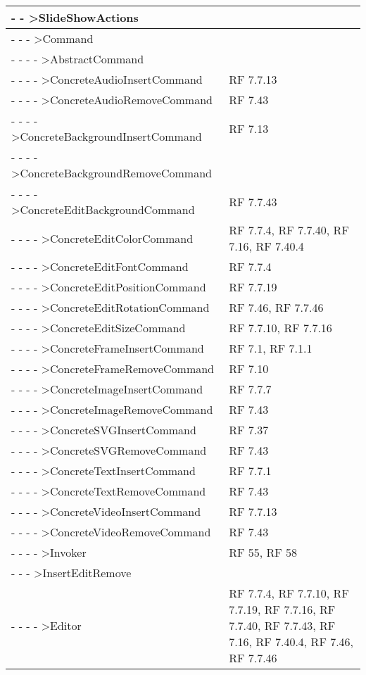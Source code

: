 {\begin{longtable} [c]{| p{8cm} | p{6cm} |}
 \hline 
- - >SlideShowActions & \\ 
 \hline 
- - - >Command & \\ 
 \hline 
- - - - >AbstractCommand & \\ 
 \hline 
- - - - >ConcreteAudioInsertCommand & RF 7.7.13\\ 
 \hline 
- - - - >ConcreteAudioRemoveCommand & RF 7.43\\ 
 \hline 
- - - - >ConcreteBackgroundInsertCommand & RF 7.13\\ 
 \hline 
- - - - >ConcreteBackgroundRemoveCommand & \\ 
 \hline 
- - - - >ConcreteEditBackgroundCommand & RF 7.7.43\\ 
 \hline 
- - - - >ConcreteEditColorCommand & RF 7.7.4, RF 7.7.40, RF 7.16, RF 7.40.4\\ 
 \hline 
- - - - >ConcreteEditFontCommand & RF 7.7.4\\ 
 \hline 
- - - - >ConcreteEditPositionCommand & RF 7.7.19\\ 
 \hline 
- - - - >ConcreteEditRotationCommand & RF 7.46, RF 7.7.46\\ 
 \hline 
- - - - >ConcreteEditSizeCommand & RF 7.7.10, RF 7.7.16\\ 
 \hline 
- - - - >ConcreteFrameInsertCommand & RF 7.1, RF 7.1.1\\ 
 \hline 
- - - - >ConcreteFrameRemoveCommand & RF 7.10\\ 
 \hline 
- - - - >ConcreteImageInsertCommand & RF 7.7.7\\ 
 \hline 
- - - - >ConcreteImageRemoveCommand & RF 7.43\\ 
 \hline 
- - - - >ConcreteSVGInsertCommand & RF 7.37\\ 
 \hline 
- - - - >ConcreteSVGRemoveCommand & RF 7.43\\ 
 \hline 
- - - - >ConcreteTextInsertCommand & RF 7.7.1\\ 
 \hline 
- - - - >ConcreteTextRemoveCommand & RF 7.43\\ 
 \hline 
- - - - >ConcreteVideoInsertCommand & RF 7.7.13\\ 
 \hline 
- - - - >ConcreteVideoRemoveCommand & RF 7.43\\ 
 \hline 
- - - - >Invoker & RF 55, RF 58\\ 
 \hline 
- - - >InsertEditRemove & \\ 
 \hline 
- - - - >Editor & RF 7.7.4, RF 7.7.10, RF 7.7.19, RF 7.7.16, RF 7.7.40, RF 7.7.43, RF 7.16, RF 7.40.4, RF 7.46, RF 7.7.46\\ 
 \hline 

\end{longtable}}

